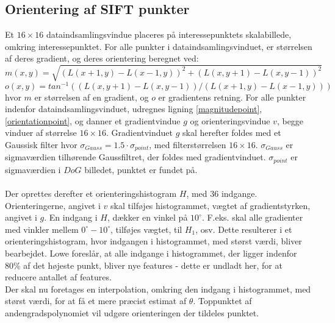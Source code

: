 \subsection{Orientering af SIFT punkter}
Et $16\times 16$ dataindsamlingsvindue placeres på interessepunktets skalabillede, omkring interessepunktet. For alle punkter i dataindsamlingsvinduet, er størrelsen af deres gradient, og deres orientering beregnet ved:
\begin{equation}
m(x,y) = \sqrt{(L(x + 1, y) - L(x - 1, y))^2 + (L(x, y + 1) - L(x, y - 1))^2} 
\label{magnitudepoint}
\end{equation}
\begin{equation}o(x,y) = tan^{-1}((L(x,y+1) - L(x,y-1))/(L(x+1, y) - L(x-1, y))) 
\label{orientationpoint}
\end{equation}
hvor $m$ er størrelsen af en gradient, og $o$ er gradientens retning. For alle punkter indenfor dataindsamlingsvinduet, udregnes ligning
\eqref{magnitudepoint}, \eqref{orientationpoint}, og danner et gradientvindue $g$ og orienteringsvindue $v$, begge vinduer af størrelse $16\times16$. Gradientvinduet $g$ skal herefter foldes med et Gaussisk filter hvor $\sigma_{Gauss} = 1.5 \cdot \sigma_{point}$, med filterstørrelsen $16\times16$.  $\sigma_{Gauss}$ er sigmaværdien tilhørende Gaussfiltret, der foldes med gradientvinduet. $\sigma_{point}$ er sigmaværdien i $DoG$ billedet, punktet er fundet på. 
\\
\\
Der oprettes derefter et orienteringshistogram $H$, med 36 indgange. Orienteringerne, angivet i $v$ skal tilføjes histogrammet, vægtet af gradientstyrken, angivet i $g$. En indgang i $H$, dækker en vinkel på $10^{\circ}$. F.eks. skal alle gradienter med vinkler mellem  $0^{\circ}-10^{\circ}$, tilføjes vægtet, til $H_1$, osv. Dette resulterer i et orienteringshistogram, hvor indgangen i histogrammet, med størst værdi, bliver bearbejdet. Lowe foreslår, at alle indgange i histogrammet, der ligger indenfor 80\% af det højeste punkt, bliver nye features - dette er undladt her, for at reducere antallet af features. 
\\
Der skal nu foretages en interpolation, omkring den indgang i histogrammet, med størst værdi, for at få et mere præcist estimat af $\theta$. Toppunktet af andengradspolynomiet vil udgøre orienteringen der tildeles punktet. 
